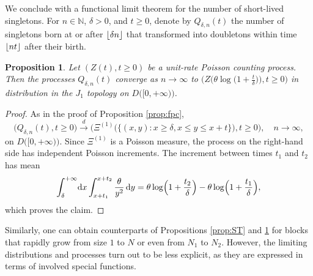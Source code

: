 \documentclass[11pt]{article}
\newcommand{\dd}{\mathrm d}
\newcommand{\N}{\mathbb{N}}
\newcommand{\1}[1][]{
	\ifx&#1&\mathds{1}
	\else\mathds{1}\left\{#1\right\}\fi}
\DeclarePairedDelimiter\floor{\lfloor}{\rfloor}
\newtheorem{proposition}{Proposition}[section]
\theoremstyle{definition}
\theoremstyle{remark}
\numberwithin{equation}{section}
\begin{document}
	We conclude with a functional limit theorem for the number of short-lived singletons.
	For $n\in\N$, $\delta>0$, and $t \ge 0$, denote by $Q_{\delta,n}(t)$ the number of singletons
	born at or after $\floor{\delta n}$ that transformed into doubletons within time  $\floor{n t}$ after their birth.
	
	\begin{proposition}
		\label{prop:Z}
		Let $(Z(t), t\ge0)$ be a unit-rate Poisson counting process. Then the processes $Q_{\delta,n}(t)$
		converge as $n\to\infty$ to $\bigl(Z\bigl(\theta\log\bigl(1+\frac{t}{\delta}\bigr)\bigr),t\ge0\bigr)$
		in distribution in the $J_1$ topology on $D\bigl([0,+\infty)\bigr)$.
	\end{proposition}
	
	\begin{proof}
		As in the proof of Proposition \ref{prop:fpc}, 
		\begin{equation*}
			\bigl(Q_{\delta,n}(t),t\ge0\bigr)\xrightarrow{d}
			\bigl(\Xi^{(1)}\bigl(\bigl\{(x,y): x\ge\delta,x\le y \le x+t\bigr\}\bigr),t\ge0\bigr), \quad n\to\infty,
		\end{equation*}
		on $D\bigl([0,+\infty)\bigr)$.
		Since $\Xi^{(1)}$ is a Poisson measure, the process on the right-hand side has independent Poisson increments.
		The increment between times $t_1$ and $t_2$ has mean
		\begin{equation*}
			\int_\delta^{+\infty}\!\dd x\int_{x+t_1}^{x+t_2} \frac{\theta}{y^2}\,\dd y
			= \theta\log\Bigl(1+\frac{t_2}{\delta}\Bigr) - \theta\log\Bigl(1+\frac{t_1}{\delta}\Bigr),
		\end{equation*}
		which proves the claim.
	\end{proof}
	
	Similarly, one can obtain counterparts of Propositions \ref{prop:ST} and \ref{prop:Z} for blocks
	that rapidly grow from size $1$ to $N$ or even from $N_1$ to $N_2$. However, the limiting distributions
	and processes turn out to be less explicit, as they are expressed in terms of involved special functions.
	
\end{document}
